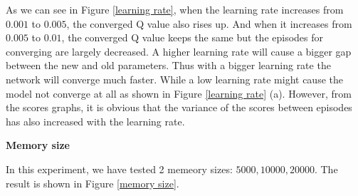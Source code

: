 \documentclass{article}
\begin{document}
As we can see in Figure \ref{learning rate}, when the learning rate increases from $0.001$ to $0.005$,
the converged Q value also rises up. And when it increases from $0.005$ to $0.01$,
the converged Q value keeps the same but the episodes for converging are largely decreased.
A higher learning rate will cause a bigger gap between the new and old parameters. Thus with a bigger
learning rate the network will converge much faster. While a low learning rate might cause the model not
converge at all as shown in Figure \ref{learning rate} (a). However, from the scores graphs, it is obvious that
the variance of the scores between episodes has also increased with the learning rate.

\textbf{Memory size}

In this experiment, we have tested 2 memeory sizes: $5000,10000,20000$. The result is shown in Figure
\ref{memory size}.
\end{document}
